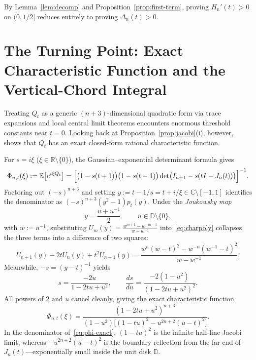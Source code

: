 \documentclass[11pt,a4paper]{article}
\newcommand{\R}{\mathbb{R}}
\newcommand{\C}{\mathbb{C}}
\newcommand{\D}{\mathbb{D}}
\newcommand{\E}{\mathbb{E}}
\theoremstyle{remark}
\numberwithin{equation}{section}
\begin{document}
By Lemma~\ref{lem:decomp} and Proposition~\ref{prop:first-term}, proving $H_n'(t) > 0$ on $(0, 1/2]$ reduces entirely to proving $\Delta_n(t) > 0$.

\section{The Turning Point: Exact Characteristic Function and the Vertical-Chord Integral}
\label{sec:chord}

Treating $Q_t$ as a generic $(n+3)$-dimensional quadratic form via trace expansions and local central limit theorems encounters enormous threshold constants near $t = 0$. Looking back at Proposition~\ref{prop:jacobi}(i), however, shows that $Q_t$ has an exact closed-form rational characteristic function.

For $s = i\xi$ ($\xi \in \R \setminus \{0\}$), the Gaussian--exponential determinant formula gives
\[
    \Phi_{n,t}(\xi) := \E\bigl[e^{i\xi Q_t}\bigr]
    = \Bigl[\bigl(1 - s(t+1)\bigr)\bigl(1 - s(t-1)\bigr)\det\bigl(I_{n+1} - s(tI - J_n(t))\bigr)\Bigr]^{-1}.
\]
Factoring out $(-s)^{n+3}$ and setting $y := t - 1/s = t + i/\xi \in \C \setminus [-1,1]$ identifies the denominator as $(-s)^{n+3}(y^2 - 1)p_t(y)$. Under the \emph{Joukowsky map}
\[
    y = \frac{u + u^{-1}}{2}, \qquad u \in \D \setminus \{0\},
\]
with $w := u^{-1}$, substituting $U_m(y) = \frac{w^{m+1} - w^{-m-1}}{w - w^{-1}}$ into~\eqref{eq:charpoly} collapses the three terms into a difference of two squares:
\[
    U_{n+1}(y) - 2tU_n(y) + t^2 U_{n-1}(y)
    = \frac{w^n(w - t)^2 - w^{-n}(w^{-1} - t)^2}{w - w^{-1}}.
\]
Meanwhile, $-s = (y - t)^{-1}$ yields
\begin{equation}
    s = \frac{-2u}{1 - 2tu + u^2},
    \qquad
    \frac{ds}{du} = \frac{-2(1 - u^2)}{(1 - 2tu + u^2)^2}.
    \label{eq:s-u}
\end{equation}
All powers of $2$ and $u$ cancel cleanly, giving the exact characteristic function
\begin{equation}
    \Phi_{n,t}(\xi)
    = \frac{(1 - 2tu + u^2)^{n+3}}{(1 - u^2)\bigl[(1 - tu)^2 - u^{2n+2}(u - t)^2\bigr]}.
    \label{eq:phi-exact}
\end{equation}
In the denominator of~\eqref{eq:phi-exact}, $(1 - tu)^2$ is the infinite half-line Jacobi limit, whereas $-u^{2n+2}(u - t)^2$ is the boundary reflection from the far end of $J_n(t)$—exponentially small inside the unit disk $\D$.
\end{document}
